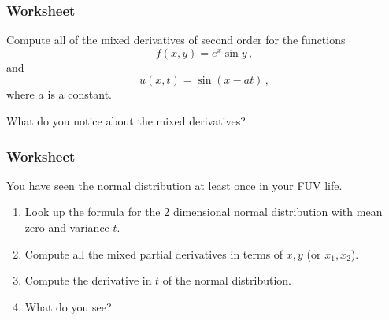 \documentclass[aspectratio=169,handout]{beamer}
\begin{document}
\begin{frame}
    \frametitle{Worksheet}
    Compute all of the mixed derivatives of second order for the functions
    \begin{equation*}
        f(x,y) = e^x \sin y \,,
    \end{equation*}
    and
    \begin{equation*}
        u(x,t) = \sin(x-at) \,,
    \end{equation*}
    where $a$ is a constant.

    What do you notice about the mixed derivatives?
\end{frame}

\begin{frame}
    \frametitle{Worksheet}
    You have seen the normal distribution at least once in your FUV life.

    \begin{enumerate}
        \item Look up the formula for the 2 dimensional normal distribution with mean zero and variance $t$.
        \item Compute all the mixed partial derivatives in terms of $x,y$ (or $x_1, x_2$).
        \item Compute the derivative in $t$ of the normal distribution.
        \item What do you see?
    \end{enumerate}
\end{frame}
\end{document}
